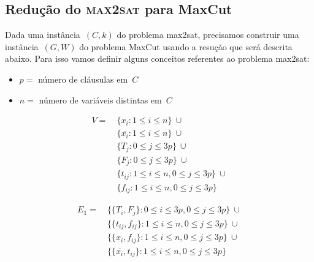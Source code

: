 
	\bigskip
	\bigskip
	\bigskip

	\subsection{Redução do \textbf{\textsc {max2sat}} para MaxCut}

		Dada uma instância~$(C,k)$ do problema {\sc max2sat}, 
		precisamos construir uma instância~$(G,W)$
		do problema MaxCut usando a resução que será descrita abaixo.
		Para isso vamos definir alguns conceitos referentes
		ao problema {\sc max2sat}:
		\begin{itemize}
			\item $p = $ número de cláusulas em~$C$
			\item $n = $ número de variáveis distintas em~$C$
		\end{itemize}

		
		\begin{align}
			V = \ &\{x_i: 1\le i\le n\} \ \cup \nonumber\\
				&\{\overline{x_i}: 1\le i\le n\} \ \cup\nonumber\\ 
				&\{T_j: 0\le j\le 3p\} \ \cup \nonumber\\
				&\{F_j: 0\le j\le 3p\} \ \cup \nonumber\\
				&\{t_{ij}: 1\le i\le n, 0\le j\le 3p\} 
					\ \cup \nonumber\\
				&\{f_{ij}: 1\le i\le n, 0\le j\le 3p\}\nonumber
		\end{align}

		\begin{align}
			E_1= \ &\{ \{T_i,F_j\}: 0\le i\le 3p, 0\le j\le 3p\}\ \cup 
					\nonumber\\
				&\{\{t_{ij}, f_{ij}\}: 1\le i\le n, 
					0\le j\le 3p\}\ \cup \nonumber \\
				&\{\{x_i, f_{ij}\}: 1\le i\le n, 
					0\le j\le 3p\} \ \cup \nonumber \\
				&\{\{\overline{x_i}, t_{ij}\}: 1\le 
					i\le n, 0\le j\le 3p\} \nonumber
		\end{align}


